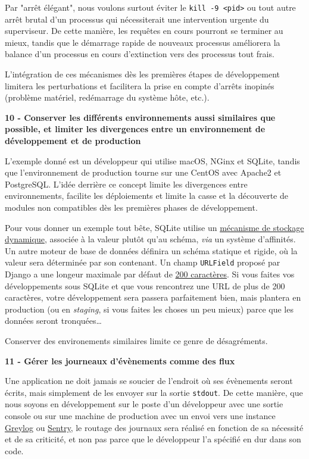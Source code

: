 \documentclass[11pt]{amsbook}
\begin{document}
Par "arrêt élégant", nous voulons surtout éviter le \texttt{kill -9 <pid>} ou tout autre arrêt brutal d’un processus qui nécessiterait une intervention urgente du superviseur.
De cette manière, les requêtes en cours pourront se terminer au mieux, tandis que le démarrage rapide de nouveaux processus améliorera la balance d’un processus en cours d’extinction vers des processus tout frais.


L’intégration de ces mécanismes dès les premières étapes de développement limitera les perturbations et facilitera la prise en compte d’arrêts inopinés (problème matériel, redémarrage du système hôte, etc.).


\textbf{10 - Conserver les différents environnements aussi similaires que possible, et limiter les divergences entre un environnement de développement et de production}


L’exemple donné est un développeur qui utilise macOS, NGinx et SQLite, tandis que l’environnement de production tourne sur une CentOS avec Apache2 et PostgreSQL.
L’idée derrière ce concept limite les divergences entre environnements, facilite les déploiements et limite la casse et la découverte de modules non compatibles dès les premières phases de développement.


Pour vous donner un exemple tout bête, SQLite utilise un \href{https://www.sqlite.org/datatype3.html}{mécanisme de stockage dynamique}, associée à la valeur plutôt qu’au schéma, \emph{via} un système d’affinités. Un autre moteur de base de données définira un schéma statique et rigide, où la valeur sera déterminée par son contenant.
Un champ \texttt{URLField} proposé par Django a une longeur maximale par défaut de \href{https://docs.djangoproject.com/en/3.1/ref/forms/fields/#django.forms.URLField}{200 caractères}.
Si vous faites vos développements sous SQLite et que vous rencontrez une URL de plus de 200 caractères, votre développement sera passera parfaitement bien, mais plantera en production (ou en \emph{staging}, si vous faites les choses un peu mieux) parce que les données seront tronquées…​


Conserver des environements similaires limite ce genre de désagréments.


\textbf{11 - Gérer les journeaux d’évènements comme des flux}


Une application ne doit jamais se soucier de l’endroit où ses évènements seront écrits, mais simplement de les envoyer sur la sortie \texttt{stdout}.
De cette manière, que nous soyons en développement sur le poste d’un développeur avec une sortie console ou sur une machine de production avec un envoi vers une instance \href{https://www.graylog.org/}{Greylog} ou \href{https://sentry.io/welcome/}{Sentry}, le routage des journaux sera réalisé en fonction de sa nécessité et de sa criticité, et non pas parce que le développeur l’a spécifié en dur dans son code.
\end{document}
